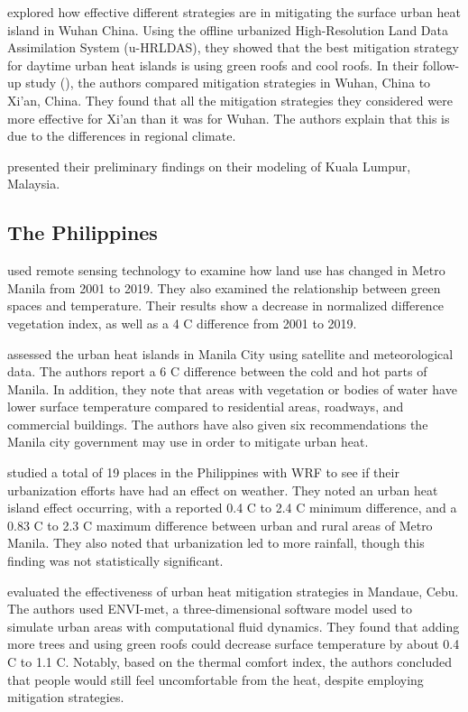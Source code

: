 		\textcite{Gao2019} explored how effective different strategies are in mitigating the surface urban heat island in Wuhan China.
		Using the offline urbanized High-Resolution Land Data Assimilation System (u-HRLDAS), they showed that the best mitigation strategy for daytime urban heat islands is using green roofs and cool roofs.
		In their follow-up study (\cite{Gao2020}), the authors compared mitigation strategies in Wuhan, China to Xi'an, China.
		They found that all the mitigation strategies they considered were more effective for Xi'an than it was for Wuhan. 
		The authors explain that this is due to the differences in regional climate.
		
		\textcite{Wang2019} presented their preliminary findings on their modeling of Kuala Lumpur, Malaysia.

	\subsection{The Philippines}
		\textcite{AlmadronesReyes2022} used remote sensing technology to examine how land use has changed in Metro Manila from 2001 to 2019. 
		They also examined the relationship between green spaces and temperature. 
		Their results show a decrease in normalized difference vegetation index, 
			as well as a 4 \degree C difference from 2001 to 2019.
		
		\textcite{Purio2022} assessed the urban heat islands in Manila City using satellite and meteorological data.
		The authors report a 6 \degree C difference between the cold and hot parts of Manila.
		In addition, they note that areas with vegetation or bodies of water have lower surface temperature compared to residential areas, roadways, and commercial buildings.
		The authors have also given six recommendations the Manila city government may use in order to mitigate urban heat.
		
		\textcite{Oliveros2019} studied a total of 19 places in the Philippines with WRF to see if their urbanization efforts have had an effect on weather.
		They noted an urban heat island effect occurring, with a reported
			0.4 \degree C to 2.4 \degree C minimum difference, and a 
			0.83 \degree C to 2.3 \degree C maximum difference
			between urban and rural areas of Metro Manila.
		They also noted that urbanization led to more rainfall, though this finding was not statistically significant.
		
		\textcite{Cortes2022} evaluated the effectiveness of urban heat mitigation strategies in Mandaue, Cebu.
		The authors used ENVI-met, a three-dimensional software model used to simulate urban areas with computational fluid dynamics.
		They found that adding more trees and using green roofs could decrease surface temperature by about 0.4 \degree C to 1.1 \degree C.
		Notably, based on the thermal comfort index, the authors concluded that people would still feel uncomfortable from the heat, despite employing mitigation strategies.

